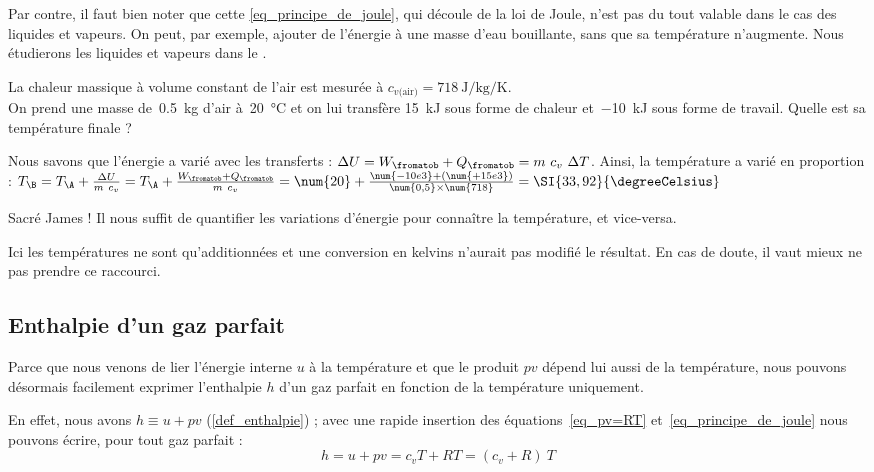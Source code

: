 		Par contre, il faut bien noter que cette \cref{eq_principe_de_joule}, qui découle de la loi de Joule, n’est pas du tout valable dans le cas des liquides et vapeurs. On peut, par exemple, ajouter de l’énergie à une masse d’eau bouillante, sans que sa température n’augmente. Nous étudierons les liquides et vapeurs dans le \courscinqshort.
		
		\begin{anexample}
			La chaleur massique à volume constant de l’air est mesurée à $c_{v\text{(air)}} = \SI{718}{\joule\per\kilogram\per\kelvin}$.\\
			On prend une masse de~\SI{0,5}{\kilogram} d’air à~\SI{20}{\degreeCelsius} et on lui transfère \SI{+15}{\kilo\joule} sous forme de chaleur et~\SI{-10}{\kilo\joule} sous forme de travail. Quelle est sa température finale ?
				\begin{answer}
					Nous savons que l’énergie a varié avec les transferts : $\Delta U = W_\fromatob + Q_\fromatob = m \ c_v \ \Delta T$. Ainsi, la température a varié en proportion : $T_\B = T_\A + \frac{\Delta U}{m \ c_v} = T_\A + \frac{W_\fromatob + Q_\fromatob}{m \ c_v} = \num{20} + \frac{\num{-10e3} + (\num{+15e3})}{\num{0,5} \times \num{718}} = \SI{33,92}{\degreeCelsius}$
				\end{answer}
					\begin{remark}Sacré James ! Il nous suffit de quantifier les variations d’énergie pour connaître la température, et vice-versa.\end{remark}
					\begin{remark}Ici les températures ne sont qu’additionnées et une conversion en \si{kelvins} n’aurait pas modifié le résultat. En cas de doute, il vaut mieux ne pas prendre ce raccourci. \end{remark}
		\end{anexample}



	\subsection{Enthalpie d’un gaz parfait}

		Parce que nous venons de lier l’énergie interne $u$ à la température et que le produit $p v$ dépend lui aussi de la température, nous pouvons désormais facilement exprimer l’enthalpie $h$ d’un gaz parfait en fonction de la température uniquement.

		En effet, nous avons $h \equiv u + p v$ (\ref{def_enthalpie}) ; avec une rapide insertion des équations~\ref{eq_pv=RT} et~\ref{eq_principe_de_joule} nous pouvons écrire, pour tout gaz parfait :
			\begin{equation}
				h = u + p v = c_v T + R T = (c_v + R) \ T
				\label{eq_h_fonction_de_T}
			\end{equation}

